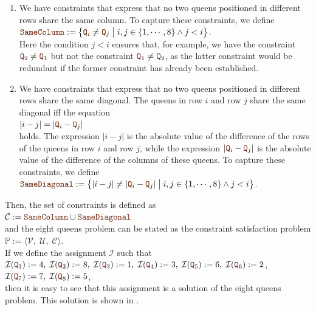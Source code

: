 \begin{enumerate}
\item We have constraints that express that no two queens positioned in different rows share the same column.
      To capture these constraints, we define
      \\[0.2cm]
      \hspace*{1.3cm}
      $\mytt{SameColumn} := \bigl\{ \mytt{Q}_i \not= \mytt{Q}_j \bigm| i,j \in \{1,\cdots,8\} \wedge j < i \bigr\}$.
      \\[0.2cm]
      Here the condition $j < i$ ensures that, for example, we have the constraint $\mytt{Q}_2 \not= \mytt{Q}_1$
      but not the constraint  $\mytt{Q}_1 \not= \mytt{Q}_2$, as the latter constraint would be redundant if
      the former constraint has already been established.
\item We have constraints that express that no two queens positioned in different rows share the same 
      diagonal.  The queens in row $i$ and row $j$ share the same diagonal iff the equation
      \\[0.2cm]
      \hspace*{1.3cm}
      $|i - j| = |\mytt{Q}_i - \mytt{Q}_j|$
      \\[0.2cm]
      holds.  The expression $|i-j|$ is the absolute value of the difference of the rows of the queens in row
      $i$ and row $j$,  while the expression $|\mytt{Q}_i - \mytt{Q}_j|$ is the absolute value of the difference of the
      columns of these queens.  To capture these constraints, we define
      \\[0.2cm]
      \hspace*{1.3cm}
      $\mytt{SameDiagonal} := \bigl\{ |i  - j| \not= |\mytt{Q}_i - \mytt{Q}_j| \bigm| i,j \in \{1,\cdots,8\} \wedge j < i \bigr\}$.
\end{enumerate}
Then, the set of constraints is defined as 
\\[0.2cm]
\hspace*{1.3cm}
$\mathcal{C} := \mytt{SameColumn} \cup \mytt{SameDiagonal}$
\\[0.2cm]
and the eight queens problem can be stated as the constraint satisfaction problem
\\[0.2cm]
\hspace*{1.3cm}
$\mathbb{P} := \langle \mathcal{V},\; \mathcal{U},\; \mathcal{C} \rangle$.
\\[0.2cm]
If we define the assignment $\mathcal{I}$ such that
\\[0.2cm]
\hspace*{1.3cm}
$\mathcal{I}(\mytt{Q}_1) := 4,\; \mathcal{I}(\mytt{Q}_2) := 8,\; \mathcal{I}(\mytt{Q}_3) := 1,\;
\mathcal{I}(\mytt{Q}_4) := 3,\; \mathcal{I}(\mytt{Q}_5) := 6,\; \mathcal{I}(\mytt{Q}_6) := 2$,
\\[0.2cm]
\hspace*{1.3cm}
$\mathcal{I}(\mytt{Q}_7) := 7,\; \mathcal{I}(\mytt{Q}_8) := 5$,
\\[0.2cm]
then it is easy to see that this assignment is a solution of the eight queens problem.  This solution is shown
in .


